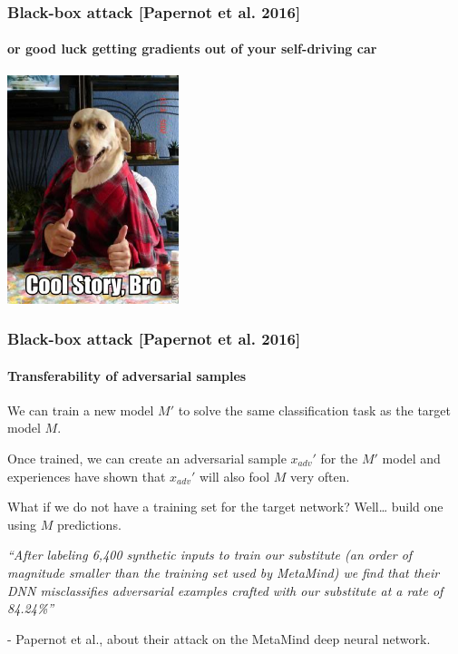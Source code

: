 \documentclass[9pt]{beamer}
\begin{document}
\begin{frame}
  \frametitle{Black-box attack [Papernot et al. 2016]}

  \framesubtitle{or good luck getting gradients out of your
    self-driving car}

  \begin{center}
    \includegraphics[width = 5cm]{images/cool_story_bro_1.jpg}
  \end{center}

\end{frame}

\begin{frame}
  \frametitle{Black-box attack [Papernot et al. 2016]}

  \framesubtitle{Transferability of adversarial samples}


  We can train a new model $M'$ to solve the same classification task
  as the target model $M$.

  \pause

  \bigskip

  Once trained, we can create an adversarial sample $x_{adv}'$ for the
  $M'$ model and experiences have shown that $x_{adv}'$ will also fool
  $M$ very often.

  \pause

  \bigskip

  What if we do not have a training set for the target network?
  Well\dots{} build one using $M$ predictions.

  \pause

  \bigskip

  \textit{``After labeling 6,400 synthetic inputs to train our
    substitute (an order of magnitude smaller than the training set
    used by MetaMind) we find that their DNN misclassifies adversarial
    examples crafted with our substitute at a rate of 84.24\%''}

  \smallskip

  - Papernot et al., about their attack on the MetaMind deep neural
  network.

\end{frame}
\end{document}
